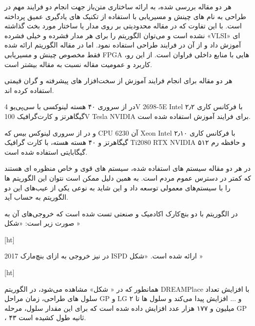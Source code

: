

هر دو مقاله بررسی شده، به ارائه ساختاری متن‌باز جهت انجام دو فرایند مهم در طراحی به نام های چینش و مسیریابی با استفاده از تکنیک های یادگیری عمیق پرداخته است. با این تفاوت که در مقاله  محدودیتی بر روی مدار یا ساختار مورد بخث گذاشته نشده است و می‌توان الگوریتم را برای هر مدار فشرده و خیلی فشرده «VLSI» ای آموزش داد و از آن در فرایند طراحی استفاده نمود. اما در مقاله  الگوریتم ارائه شده فقط مخصوص چینش و مسیریابی FPGA هایی با منابع داخلی فراوان است. از این رو، کاربرد و عمومیت مقاله  نسبت به مقاله  بیشتر است.

هر دو مقاله برای انجام فرایند آموزش از سخت‌افزار های پیشرفته و گران قیمتی استفاده کرده اند.

در  از سروری ۴۰ هسته لینوکسی با سی‌پی‌یو 4V 2698-5E Intel با فرکانس کاری ۲٫۲ گیگاهرتز و کارت‌گرافیک 	100V Tesla NVIDIA برای فرایند آموزش استفاده شده است.

و در  از سروری لینوکس بیس که CPU آن 6230 Xeon Intel با فرکانس کاری ۲٫۱۰ گیگاهرتز و ۴۰ هسته 
هسته، با کارت گرافیک Ti2080 RTX NVIDIA و حافظه رم ۵۱۲ گیگابایتی استفاده شده است.

در هر دو مقاله سیستم های استفاده شده، سیستم های قوی و خاص منظوره ای هستند که کمتر در دسترس عموم مردم است. به همین دلیل ممکن است نتوان این الگوریتم ها را با سیستم‌های معمولی توسعه داد و این شاید به نوعی یکی از عیب‌های این دو الگوریتم به حساب آید.

در  الگوریتم با دو بنچ‌کارک اکادمیک و صنعتی تست شده است که خروجی‌های آن به صورت زیر است: «شکل »
	
[ht]

در  نیز خروجی به ازای بنچ‌مارک 2017 ISPD ارائه شده است. «شکل »

[ht]

همانطور که در « شکل» مشاهده می‌شود، در الگوریتم DREAMPlace با افزایش تعداد سلول های طراحی، زمان مراحل GP و LG و ... افزایش پیدا می‌کند و سلول ها تا ۲ میلیون و ۱۷۷ هزار عدد افزایش داده شده است که برای این مقدار سلول، مرحله GP ، ۴۳ ثانیه طول کشیده است.


